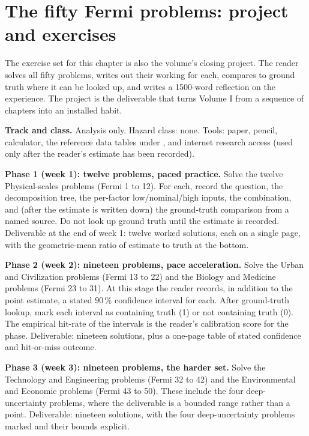 \section{The fifty Fermi problems: project and exercises}

The exercise set for this chapter is also the volume's closing
project. The reader solves all fifty problems, writes out their
working for each, compares to ground truth where it can be looked
up, and writes a 1500-word reflection on the experience. The
project is the deliverable that turns Volume I from a sequence of
chapters into an installed habit.

\begin{project}

\textbf{Track and class.}
Analysis only. Hazard class: none. Tools: paper, pencil,
calculator, the reference data tables under
,
and internet research access (used only after the reader's
estimate has been recorded).

\textbf{Phase 1 (week 1): twelve problems, paced practice.}
Solve the twelve Physical-scales problems (Fermi 1 to 12). For
each, record the question, the decomposition tree, the per-factor
low/nominal/high inputs, the combination, and (after the estimate is
written down) the ground-truth comparison from a named source. Do
not look up ground truth until the estimate is recorded. Deliverable
at the end of week 1: twelve worked solutions, each on a single
page, with the geometric-mean ratio of estimate to truth at the
bottom.

\textbf{Phase 2 (week 2): nineteen problems, pace acceleration.}
Solve the Urban and Civilization problems (Fermi 13 to 22) and the
Biology and Medicine problems (Fermi 23 to 31). At this stage the
reader records, in addition to the point estimate, a stated
$90\,\%$ confidence interval for each. After ground-truth lookup,
mark each interval as containing truth (1) or not containing truth
(0). The empirical hit-rate of the intervals is the reader's
calibration score for the phase. Deliverable: nineteen solutions,
plus a one-page table of stated confidence and hit-or-miss outcome.

\textbf{Phase 3 (week 3): nineteen problems, the harder set.}
Solve the Technology and Engineering problems (Fermi 32 to 42) and
the Environmental and Economic problems (Fermi 43 to 50). These
include the four deep-uncertainty problems, where the deliverable
is a bounded range rather than a point. Deliverable: nineteen
solutions, with the four deep-uncertainty problems marked and
their bounds explicit.


\end{project}
